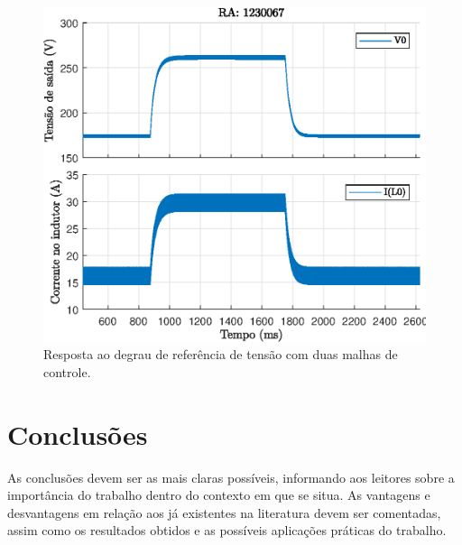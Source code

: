 \begin{figure}[!ht]
	\centering
	\includegraphics[width=0.9\linewidth]{Figs/Buck-Boost2malhas}
	\caption{Resposta ao degrau de referência de tensão com duas malhas de controle.}
	\label{fig:Buck-Boost2malhas}
\end{figure}


\section{Conclusões} 

As conclusões devem ser as mais claras possíveis, informando aos leitores sobre a importância do trabalho dentro do contexto em que se situa. As vantagens e desvantagens em relação aos já existentes na literatura devem ser comentadas, assim como os resultados obtidos e as possíveis aplicações práticas do trabalho.





\balance


